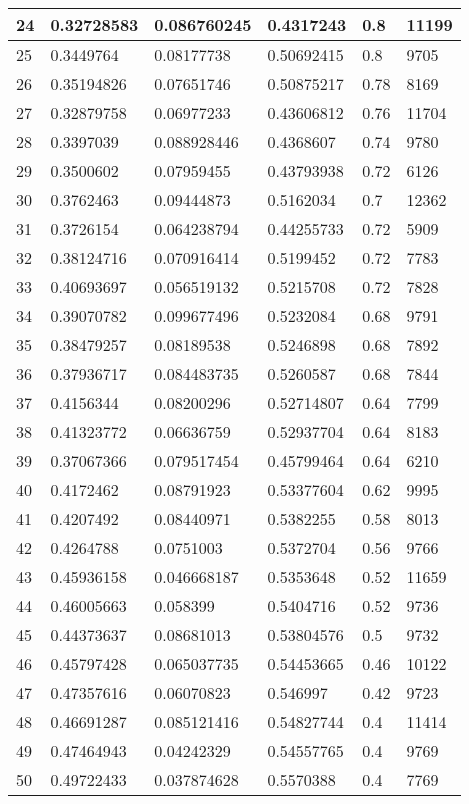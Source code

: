 \begin{longtable}{|l|l|l|l|l|l|}
24 & 0.32728583 & 0.086760245 & 0.4317243 & 0.8 & 11199 \\ \hline 
25 & 0.3449764 & 0.08177738 & 0.50692415 & 0.8 & 9705 \\ \hline 
26 & 0.35194826 & 0.07651746 & 0.50875217 & 0.78 & 8169 \\ \hline 
27 & 0.32879758 & 0.06977233 & 0.43606812 & 0.76 & 11704 \\ \hline 
28 & 0.3397039 & 0.088928446 & 0.4368607 & 0.74 & 9780 \\ \hline 
29 & 0.3500602 & 0.07959455 & 0.43793938 & 0.72 & 6126 \\ \hline 
30 & 0.3762463 & 0.09444873 & 0.5162034 & 0.7 & 12362 \\ \hline 
31 & 0.3726154 & 0.064238794 & 0.44255733 & 0.72 & 5909 \\ \hline 
32 & 0.38124716 & 0.070916414 & 0.5199452 & 0.72 & 7783 \\ \hline 
33 & 0.40693697 & 0.056519132 & 0.5215708 & 0.72 & 7828 \\ \hline 
34 & 0.39070782 & 0.099677496 & 0.5232084 & 0.68 & 9791 \\ \hline 
35 & 0.38479257 & 0.08189538 & 0.5246898 & 0.68 & 7892 \\ \hline 
36 & 0.37936717 & 0.084483735 & 0.5260587 & 0.68 & 7844 \\ \hline 
37 & 0.4156344 & 0.08200296 & 0.52714807 & 0.64 & 7799 \\ \hline 
38 & 0.41323772 & 0.06636759 & 0.52937704 & 0.64 & 8183 \\ \hline 
39 & 0.37067366 & 0.079517454 & 0.45799464 & 0.64 & 6210 \\ \hline 
40 & 0.4172462 & 0.08791923 & 0.53377604 & 0.62 & 9995 \\ \hline 
41 & 0.4207492 & 0.08440971 & 0.5382255 & 0.58 & 8013 \\ \hline 
42 & 0.4264788 & 0.0751003 & 0.5372704 & 0.56 & 9766 \\ \hline 
43 & 0.45936158 & 0.046668187 & 0.5353648 & 0.52 & 11659 \\ \hline 
44 & 0.46005663 & 0.058399 & 0.5404716 & 0.52 & 9736 \\ \hline 
45 & 0.44373637 & 0.08681013 & 0.53804576 & 0.5 & 9732 \\ \hline 
46 & 0.45797428 & 0.065037735 & 0.54453665 & 0.46 & 10122 \\ \hline 
47 & 0.47357616 & 0.06070823 & 0.546997 & 0.42 & 9723 \\ \hline 
48 & 0.46691287 & 0.085121416 & 0.54827744 & 0.4 & 11414 \\ \hline 
49 & 0.47464943 & 0.04242329 & 0.54557765 & 0.4 & 9769 \\ \hline 
50 & 0.49722433 & 0.037874628 & 0.5570388 & 0.4 & 7769 \\ \hline 
\end{longtable}